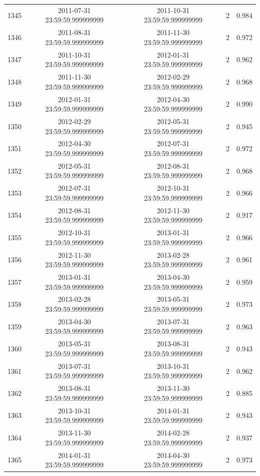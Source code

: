 \begin{table}
\begin{tabular}{lcccc}
1345 & 2011-07-31 23:59:59.999999999 & 2011-10-31 23:59:59.999999999 & 2 & 0.984 \\
1346 & 2011-08-31 23:59:59.999999999 & 2011-11-30 23:59:59.999999999 & 2 & 0.972 \\
1347 & 2011-10-31 23:59:59.999999999 & 2012-01-31 23:59:59.999999999 & 2 & 0.962 \\
1348 & 2011-11-30 23:59:59.999999999 & 2012-02-29 23:59:59.999999999 & 2 & 0.968 \\
1349 & 2012-01-31 23:59:59.999999999 & 2012-04-30 23:59:59.999999999 & 2 & 0.990 \\
1350 & 2012-02-29 23:59:59.999999999 & 2012-05-31 23:59:59.999999999 & 2 & 0.945 \\
1351 & 2012-04-30 23:59:59.999999999 & 2012-07-31 23:59:59.999999999 & 2 & 0.972 \\
1352 & 2012-05-31 23:59:59.999999999 & 2012-08-31 23:59:59.999999999 & 2 & 0.968 \\
1353 & 2012-07-31 23:59:59.999999999 & 2012-10-31 23:59:59.999999999 & 2 & 0.966 \\
1354 & 2012-08-31 23:59:59.999999999 & 2012-11-30 23:59:59.999999999 & 2 & 0.917 \\
1355 & 2012-10-31 23:59:59.999999999 & 2013-01-31 23:59:59.999999999 & 2 & 0.966 \\
1356 & 2012-11-30 23:59:59.999999999 & 2013-02-28 23:59:59.999999999 & 2 & 0.961 \\
1357 & 2013-01-31 23:59:59.999999999 & 2013-04-30 23:59:59.999999999 & 2 & 0.959 \\
1358 & 2013-02-28 23:59:59.999999999 & 2013-05-31 23:59:59.999999999 & 2 & 0.973 \\
1359 & 2013-04-30 23:59:59.999999999 & 2013-07-31 23:59:59.999999999 & 2 & 0.963 \\
1360 & 2013-05-31 23:59:59.999999999 & 2013-08-31 23:59:59.999999999 & 2 & 0.943 \\
1361 & 2013-07-31 23:59:59.999999999 & 2013-10-31 23:59:59.999999999 & 2 & 0.962 \\
1362 & 2013-08-31 23:59:59.999999999 & 2013-11-30 23:59:59.999999999 & 2 & 0.885 \\
1363 & 2013-10-31 23:59:59.999999999 & 2014-01-31 23:59:59.999999999 & 2 & 0.943 \\
1364 & 2013-11-30 23:59:59.999999999 & 2014-02-28 23:59:59.999999999 & 2 & 0.937 \\
1365 & 2014-01-31 23:59:59.999999999 & 2014-04-30 23:59:59.999999999 & 2 & 0.973 \\

\end{tabular}
\end{table}
